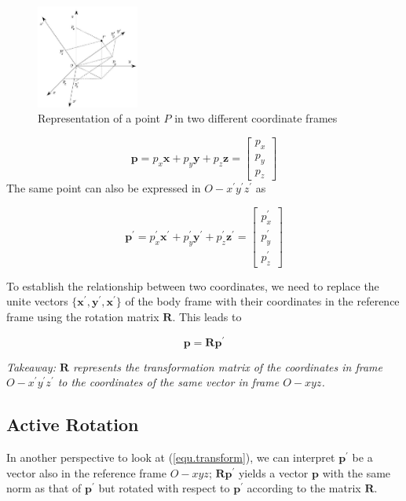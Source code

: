 \documentclass[10pt]{article}
\begin{document}
\begin{figure}[h]
    \centering
    \includegraphics[max width=0.3\textwidth]{./kinematics/coordinate_transformation}
    \caption{Representation of a point $P$ in two different coordinate frames}
    \label{c1.rotation1}
\end{figure}


$$
\boldsymbol{p}=p_{x} \boldsymbol{x} +
p_{y} \boldsymbol{y} +
p_{z}\boldsymbol{z} 
=\left[\begin{array}{c}
p_{x} \\
p_{y} \\
p_{z}
\end{array}\right]
$$
The same point can also be expressed in $O- x^{\prime} y^{\prime} z^{\prime}$ as

$$
\boldsymbol{p}^{\prime}=p_{x}^{\prime} \boldsymbol{x}^{\prime} +
p_{y}^{\prime} \boldsymbol{y}^{\prime} +
p_{z}^{\prime}\boldsymbol{z}^{\prime} =\left[\begin{array}{c}
p_{x}^{\prime} \\
p_{y}^{\prime} \\
p_{z}^{\prime}
\end{array}\right]
$$



To establish the relationship between two coordinates, we need to replace the unite vectors $\{\boldsymbol{x}^{\prime}, \boldsymbol{y}^{\prime}, \boldsymbol{x}^{\prime}\}$ of the body frame with their coordinates in the reference frame using the rotation matrix  $\boldsymbol{R}$. This leads to

\begin{equation}\label{equ.transform}
    \boldsymbol{p}=\boldsymbol{R}\boldsymbol{p}^{\prime}
\end{equation}

\emph{Takeaway: $\boldsymbol{R}$ represents the transformation matrix of the coordinates in frame $O- x^{\prime} y^{\prime} z^{\prime}$ to the coordinates of the same vector in frame $O- x y z$. }




\subsection{Active Rotation}
In another perspective to look at (\ref{equ.transform}), we can interpret  $\boldsymbol{p}^{\prime}$ be a vector also in the reference frame $O- x y z$;  $\boldsymbol{R} \boldsymbol{p}^{\prime}$ yields a vector $\boldsymbol{p}$ with the same norm as that of $\boldsymbol{p}^{\prime}$ but rotated with respect to $\boldsymbol{p}^{\prime}$ according to the matrix $\boldsymbol{R}$.
\end{document}
